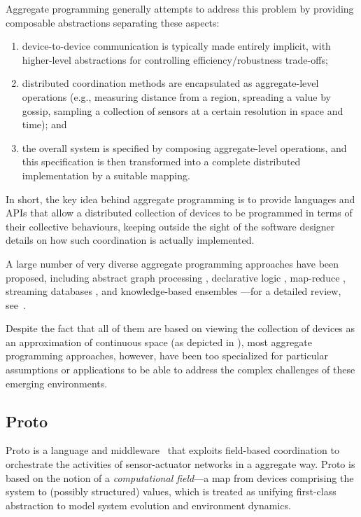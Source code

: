\documentclass[12pt,a4paper,twoside,openright]{book}
\begin{document}
Aggregate programming generally attempts to address this problem by providing composable abstractions separating these aspects:
\begin{enumerate}
 \item device-to-device communication is typically made entirely implicit, with higher-level abstractions for controlling efficiency/robustness trade-offs;
 \item distributed coordination methods are encapsulated as aggregate-level operations (e.g., measuring distance from a region, spreading a value by gossip, sampling a collection of sensors at a certain resolution in space and time); and
 \item the overall system is specified by composing aggregate-level operations, and this specification is then transformed into a complete distributed implementation by a suitable mapping.
\end{enumerate}

\noindent{}
In short, the key idea behind aggregate programming is to provide languages and APIs that allow a distributed collection of devices to be programmed in terms of their collective behaviours, keeping outside the sight of the software designer details on how such coordination is actually implemented.

A large number of very diverse aggregate programming approaches have been proposed, including abstract graph processing \cite{kairos}, declarative logic \cite{Meld}, map-reduce \cite{dean2008mapreduce}, streaming databases \cite{tinydb}, and knowledge-based ensembles \cite{SCEL}---for a detailed review, see~\cite{SpatialIGI2013}.

Despite the fact that all of them are based on viewing the collection of devices as an approximation of continuous space (as depicted in ), most aggregate programming approaches, however, have been too specialized for particular assumptions or applications to be able to address the complex challenges of these emerging environments.

\subsection{Proto}
\label{proto}

Proto is a language and middleware~\cite{proto} that exploits field-based coordination to orchestrate the activities of sensor-actuator networks in a aggregate way.
%
Proto is based on the notion of a {\em computational field}---a map from devices comprising the system to (possibly structured) values, which is treated as unifying first-class abstraction to model system evolution and environment dynamics.
\end{document}
